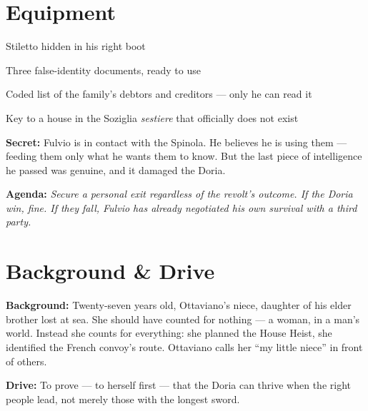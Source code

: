 \section*{Equipment}
\begin{goldlist}
  \item Stiletto hidden in his right boot
  \item Three false-identity documents, ready to use
  \item Coded list of the family's debtors and creditors --- only he can read it
  \item Key to a house in the Soziglia \textit{sestiere} that officially does not exist
\end{goldlist}

\clearpage

\begin{secretbox}
  \textbf{Secret:} Fulvio is in contact with the Spinola. He believes he is using
  them --- feeding them only what he wants them to know. But the last piece of
  intelligence he passed was genuine, and it damaged the Doria.

  \medskip\noindent\textcolor{SecretRed}{\textbf{Agenda:}}
  \textit{Secure a personal exit regardless of the revolt's outcome. If the Doria
  win, fine. If they fall, Fulvio has already negotiated his own survival
  with a third party.}
\end{secretbox}

\clearpage



\section*{Background \& Drive}
\begin{rulebox}{}
  \textbf{Background:} Twenty-seven years old, Ottaviano's niece, daughter of his
  elder brother lost at sea. She should have counted for nothing --- a woman, in a
  man's world. Instead she counts for everything: she planned the House Heist,
  she identified the French convoy's route. Ottaviano calls her ``my little niece''
  in front of others.

  \medskip\noindent\textcolor{DoriaBlue}{\textbf{Drive:}} To prove --- to herself
  first --- that the Doria can thrive when the right people lead, not merely those
  with the longest sword.
\end{rulebox}

